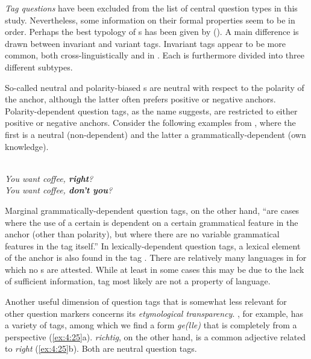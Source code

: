 \textit{Tag questions} have been excluded from the list of central question types in this study. Nevertheless, some information on their formal properties seem to be in order. Perhaps the best typology of s has been given by \citet[803]{Axelsson2011} (). A main difference is drawn between invariant and variant tags. Invariant tags appear to be more common, both cross-linguistically and in . Each is furthermore divided into three different subtypes.

So-called neutral and polarity-biased s are neutral with respect to the polarity of the anchor, although the latter often prefers positive or negative anchors. Polarity-dependent question tags, as the name suggests, are restricted to either positive or negative anchors. Consider the following examples from  , where the first is a neutral (non-dependent) and the latter a grammatically-dependent  (own knowledge).

\ea%
    \label{ex:4:24}
    \\
    \ea
      \textit{You want coffee, \textbf{{right}}?}\\
    
    \ex
      \textit{You want coffee, \textbf{{don’t you}}?}\\
    \z
    \z

Marginal grammatically-dependent question tags, on the other hand, “are cases where the use of a certain  is dependent on a certain grammatical feature in the anchor (other than polarity), but where there are no variable grammatical features in the tag itself.” \citep[805]{Axelsson2011} In lexically-dependent question tags, a lexical element of the anchor is also found in the tag \citep[805]{Axelsson2011}. There are relatively many languages in  for which no s are attested. While at least in some cases this may be due to the lack of sufficient information, tag  most likely are not a  property of language.

Another useful dimension of question tags that is somewhat less relevant for other question markers concerns its \textit{etymological transparency}. , for example, has a variety of tags, among which we find a form \textit{ge(lle)} that is completely  from a  perspective (\ref{ex:4:25}a).  \textit{richtig}, on the other hand, is a common adjective related to  \textit{right} (\ref{ex:4:25}b). Both are neutral question tags.


